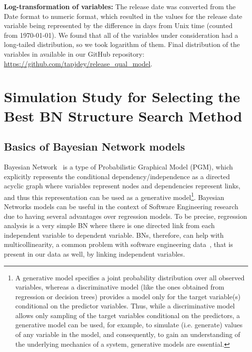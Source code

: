 \documentclass[smallextended]{svjour3}       %
\begin{document}
\noindent
\textbf{Log-transformation of variables:}
The release date was converted from the Date format to numeric format, which 
resulted in the values for the release date variable being represented by the 
difference in days from Unix time (counted from 1970-01-01).
We found that all of the variables under consideration
had a long-tailed distribution, so we took logarithm of them. Final distribution of the variables in available in our GitHub repository:\\ \url{https://github.com/tapjdey/release\_qual\_model}.


\section{Simulation Study for Selecting the Best BN Structure Search Method}\label{s:sim}

\subsection{Basics of Bayesian Network models}
Bayesian Network~\cite{koller2009probabilistic,scutari2010introduction} 
is a type of Probabilistic Graphical Model (PGM), which explicitly represents the
conditional dependency/independence as a directed acyclic graph where variables
represent nodes and dependencies represent links, and thus this
representation can be used as a generative model\footnote{A
  generative model specifies a joint probability distribution over
  all observed variables, whereas a discriminative model
  (like the ones obtained from regression or decision trees) provides a
  model only for the target variable(s) conditional on the predictor
  variables. Thus, while a discriminative model allows only sampling
  of the target variables conditional on the predictors, a
  generative model can be used, for example, to simulate
  (i.e. generate) values of any variable in the model, and
  consequently, to gain an understanding of the underlying mechanics
  of a system, generative models are essential.}.  
Bayesian Networks models can be useful in the context of Software Engineering research~\cite{fenton1999critique} due to having several advantages over
regression models. To be precise, regression analysis is a very
simple BN where there is one directed link from each independent variable
to dependent variable. BNs, therefore, can help with 
multicollinearity, a common problem with software engineering 
data~\cite{yu2002predicting,subramanyam2003empirical,briand2000exploring,Changes07}, 
that is present in our data as well, by linking independent variables. 
\end{document}
